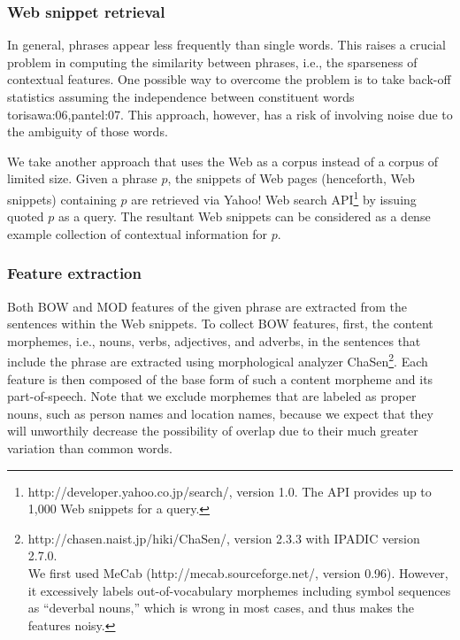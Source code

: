 \documentclass[english]{jnlp_1.4}
\renewcommand{\cite}{}
\begin{document}
\subsubsection{Web snippet retrieval}

In general, phrases appear less frequently than single words.  This
raises a crucial problem in computing the similarity between phrases,
i.e., the sparseness of contextual features.
One possible way to overcome the problem is to take back-off
statistics assuming the independence between constituent words
\cite{torisawa:06,pantel:07}.  This approach, however, has a risk of
involving noise due to the ambiguity of those words.

We take another approach that uses the Web as a corpus instead of a
corpus of limited size.  Given a phrase $p$, the snippets of Web pages
(henceforth, Web snippets) containing $p$ are retrieved via Yahoo! Web
    search API\footnote{http://developer.yahoo.co.jp/search/,
  version 1.0.  The API provides up to 1,000 Web snippets for a
  query.} by issuing quoted $p$ as a query.
The resultant Web snippets can be considered as a dense example
collection of contextual information for $p$.

\subsubsection{Feature extraction}

Both BOW and MOD features of the given phrase are extracted from the
sentences within the Web snippets.
To collect BOW features, first, the content morphemes, i.e., nouns,
verbs, adjectives, and adverbs, in the sentences that include the
phrase are extracted using morphological analyzer
    ChaSen\footnote{http://chasen.naist.jp/hiki/ChaSen/, version
  2.3.3 with IPADIC version 2.7.0.\\We first used MeCab
      (http://mecab.sourceforge.net/, version 0.96).  However, it
  excessively labels out-of-vocabulary morphemes including symbol
  sequences as ``deverbal nouns,'' which is wrong in most cases, and
  thus makes the features noisy.}.
Each feature is then composed of the base form of such a content
morpheme and its part-of-speech.  Note that we exclude morphemes that
are labeled as proper nouns, such as person names and location names,
because we expect that they will unworthily decrease the possibility
of overlap due to their much greater variation than common words.
\end{document}
